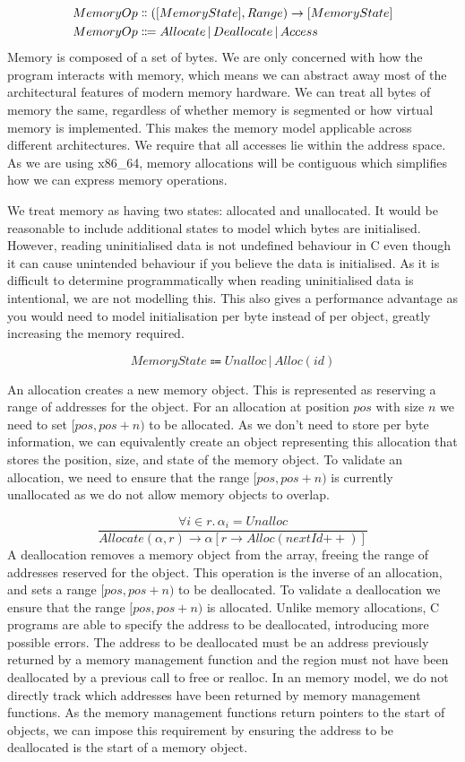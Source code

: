\documentclass[12pt,twoside]{report}
\begin{document}
\begin{align*}
MemoryOp &\dblcolon ([MemoryState], Range) \rightarrow [MemoryState] \\
MemoryOp &\Coloneqq Allocate \, | \, Deallocate \, | \, Access \\
\end{align*}
Memory is composed of a set of bytes. We are only concerned with how the program interacts with memory, which means we can abstract away most of the architectural features of modern memory hardware. We can treat all bytes of memory the same, regardless of whether memory is segmented or how virtual memory is implemented. This makes the memory model applicable across different architectures. We require that all accesses lie within the address space. As we are using x86\_64, memory allocations will be contiguous which simplifies how we can express memory operations.

We treat memory as having two states: allocated and unallocated. It would be reasonable to include additional states to model which bytes are initialised. However, reading uninitialised data is not undefined behaviour in C even though it can cause unintended behaviour if you believe the data is initialised. As it is difficult to determine programmatically when reading uninitialised data is intentional, we are not modelling this. This also gives a performance advantage as you would need to model initialisation per byte instead of per object, greatly increasing the memory required.

$$MemoryState \Coloneqq Unalloc \, | \, Alloc(id)$$

An allocation creates a new memory object. This is represented as reserving a range of addresses for the object. For an allocation at position $pos$ with size $n$ we need to set $[pos, pos + n)$ to be allocated. As we don't need to store per byte information, we can equivalently create an object representing this allocation that stores the position, size, and state of the memory object. To validate an allocation, we need to ensure that the range $[pos, pos + n)$ is currently unallocated as we do not allow memory objects to overlap.

$$\frac{\forall i \in r. \, \alpha_i = Unalloc}{Allocate(\alpha, r) \rightarrow \alpha[r \rightarrow Alloc(nextId\mathrel{{+}{+}})]}$$
A deallocation removes a memory object from the array, freeing the range of addresses reserved for the object. This operation is the inverse of an allocation, and sets a range $[pos, pos + n)$ to be deallocated. To validate a deallocation we ensure that the range $[pos, pos + n)$ is allocated. Unlike memory allocations, C programs are able to specify the address to be deallocated, introducing more possible errors. The address to be deallocated must be an address previously returned by a memory management function and the region must not have been deallocated by a previous call to free or realloc. In an memory model, we do not directly track which addresses have been returned by memory management functions. As the memory management functions return pointers to the start of objects, we can impose this requirement by ensuring the address to be deallocated is the start of a memory object.
\end{document}
